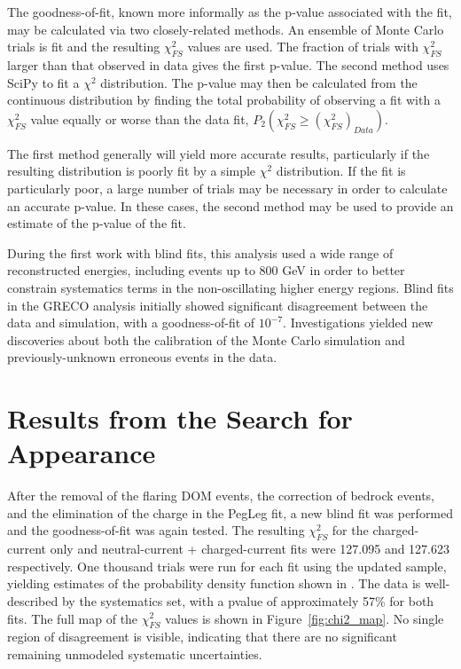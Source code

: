 The goodness-of-fit, known more informally as the p-value associated with the fit, may be calculated via two closely-related methods.
An ensemble of Monte Carlo trials is fit and the resulting $\chi_{FS}^2$ values are used.
The fraction of trials with $\chi_{FS}^2$ larger than that observed in data gives the first p-value.
The second method uses SciPy  to fit a $\chi^2$ distribution. 
The p-value may then be calculated from the continuous distribution by finding the total probability of observing a fit with a $\chi_{FS}^2$ value equally or worse than the data fit, ${P_2\left(\chi_{FS}^2 \geq \left(\chi_{FS}^2\right)_{Data}\right)}$.

The first method generally will yield more accurate results, particularly if the resulting distribution is poorly fit by a simple $\chi^2$ distribution. 
If the fit is particularly poor, a large number of trials may be necessary in order to calculate an accurate p-value.
In these cases, the second method may be used to provide an estimate of the p-value of the fit.

During the first work with blind fits, this analysis used a wide range of reconstructed energies, including events up to 800 GeV in order to better constrain systematics terms in the non-oscillating higher energy regions.
Blind fits in the GRECO analysis initially showed significant disagreement between the data and simulation, with a goodness-of-fit of ${10^{-7}}$.
Investigations yielded new discoveries about both the calibration of the Monte Carlo simulation and previously-unknown erroneous events in the data.


\label{section:tau_results}
\section{Results from the Search for Appearance}
After the removal of the flaring DOM events, the correction of bedrock events, and the elimination of the charge in the PegLeg fit, a new blind fit was performed and the goodness-of-fit was again tested.
The resulting $\chi^2_{FS}$ for the charged-current only and neutral-current + charged-current fits were 127.095 and 127.623 respectively.
One thousand trials were run for each fit using the updated sample, yielding estimates of the probability density function shown in .
The data is well-described by the systematics set, with a pvalue of approximately 57\% for both fits.
The full map of the ${\chi^2_{FS}}$ values is shown in Figure~\ref{fig:chi2_map}.
No single region of disagreement is visible, indicating that there are no significant remaining unmodeled systematic uncertainties.

